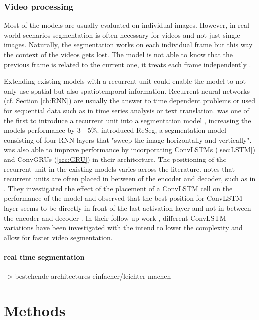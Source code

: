 \documentclass[11pt,
  paper=a4, 
  bibliography=totocnumbered,
	captions=tableheading,
	BCOR=10mm
]{scrreprt}
\theoremstyle{definition}
\newcommand{\secref}[1]{%
	\IfBeginWith{#1}{chap:}{%
		(cf. Chapter \ref{#1})}%
		{(cf. Section \ref{#1})}%
		}
\begin{document}
\subsection{Video processing}

Most of the models are usually evaluated on individual images.
However, in real world scenarios segmentation is often necessary for videos and not just single images.
Naturally, the segmentation works on each individual frame but this way the context of the videos gets lost.
The model is not able to know that the previous frame is related to the current one, it treats each frame independently \cite{Pfeuffer2019}.

Extending existing models with a recurrent unit could enable the model to not only use spatial but also spatiotemporal information\cite{Pfeuffer2019}.
Recurrent neural networks \secref{ch:RNN} are usually the answer to time dependent problems \cite{Hoffmann2017} or used for sequential data such as in time series analysis or text translation. 
\textcite{Valipour2017} was one of the first to introduce a recurrent unit into a segmentation model \cite{Pfeuffer2019}, increasing the models performance by 3 - 5\%.
\textcite{Visin2015} introduced ReSeg, a segmentation model consisting of four RNN layers that "sweep the image horizontally and vertically".
\textcite{Yurdakul2017} was also able to improve performance by incorporating ConvLSTMs (\ref{sec:LSTM}) and ConvGRUs (\ref{sec:GRU}) in their architecture.
The positioning of the recurrent unit in the existing models varies across the literature.
\textcite{Pfeuffer2019} notes that recurrent units are often placed in between of the encoder and decoder, such as in \cite{Valipour2017,Yurdakul2017}.
They investigated the effect of the placement of a ConvLSTM cell on the performance of the model and observed that the best position for ConvLSTM layer seems to be directly in front of the last activation layer and not in between the encoder and decoder \cite{Pfeuffer2019}.
In their follow up work \cite{Pfeuffer2_2019}, different ConvLSTM variations have been investigated with the intend to lower the complexity and allow for faster video segmentation.

\subsubsection{real time segmentation}
--> bestehende architectures einfacher/leichter machen

\chapter{Methods} 
\label{ch:Methods}
\end{document}
